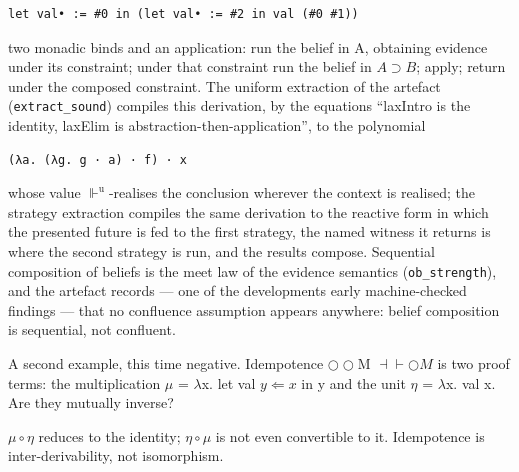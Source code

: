\begin{lstlisting}
let val• := #0 in (let val• := #2 in val (#0 #1))
\end{lstlisting}

two monadic binds and an application: run the belief in A, obtaining
evidence under its constraint; under that constraint run the belief in
\ensuremath{A \supset B}; apply; return under the composed constraint. The uniform
extraction of the artefact (\texttt{extract\_sound}) compiles this derivation,
by the equations ``laxIntro is the identity, laxElim is
abstraction-then-application'', to the polynomial

\begin{lstlisting}
(λa. (λg. g · a) · f) · x
\end{lstlisting}

whose value \ensuremath{\Vdash^{\mathrm{u}}}-realises the conclusion wherever the context is
realised; the strategy extraction compiles the same derivation to the
reactive form in which the presented future is fed to the first
strategy, the named witness it returns is where the second strategy is
run, and the results compose. Sequential composition of beliefs is the
meet law of the evidence semantics (\texttt{ob\_strength}), and the artefact
records --- one of the development\textquotesingle s early machine-checked
findings --- that no confluence assumption appears anywhere: belief
composition is sequential, not confluent.

A second example, this time negative.
Idempotence \ensuremath{\bigcirc\bigcirc}M \ensuremath{\dashv\vdash \bigcirc M} is two proof terms: the multiplication
\ensuremath{\mu} = \ensuremath{\lambda}x. let val \ensuremath{y \Leftarrow x} in y and the unit \ensuremath{\eta} = \ensuremath{\lambda}x. val x. Are they
mutually inverse?

\begin{proposition}\label{prop:mueta}
\ensuremath{\mu \circ \eta} reduces to the identity; \ensuremath{\eta \circ \mu} is not even convertible
to it. Idempotence is inter-derivability, not isomorphism.
\end{proposition}

